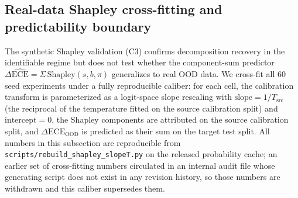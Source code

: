 \documentclass[review,12pt,nonatbib]{elsarticle}
\begin{document}
\subsection{Real-data Shapley cross-fitting and predictability boundary}
\label{sec:real_shapley}
The synthetic Shapley validation (C3) confirms decomposition recovery
in the identifiable regime but does not test whether the component-sum
predictor $\Delta\widehat{\text{ECE}} = \Sigma\,\text{Shapley}(s, b,
\pi)$ generalizes to real OOD data. We cross-fit all 60 seed
experiments under a fully reproducible caliber: for each cell, the
calibration transform is parameterized as a logit-space slope
rescaling with $\text{slope} = 1/T_{\text{src}}$ (the reciprocal of
the temperature fitted on the source calibration split) and
$\text{intercept} = 0$, the Shapley components are attributed on the
source calibration split, and $\Delta\text{ECE}_{\text{OOD}}$ is
predicted as their sum on the target test split. All numbers in this
subsection are reproducible from
\texttt{scripts/rebuild\_shapley\_slopeT.py} on the released
probability cache; an earlier set of cross-fitting numbers circulated
in an internal audit file whose generating script does not exist in
any revision history, so those numbers are withdrawn and this caliber
supersedes them.
\end{document}

